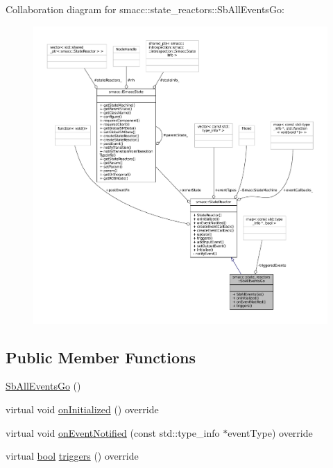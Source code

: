 Collaboration diagram for smacc\+:\+:state\+\_\+reactors\+:\+:Sb\+All\+Events\+Go\+:
\nopagebreak
\begin{figure}[H]
\begin{center}
\leavevmode
\includegraphics[width=350pt]{classsmacc_1_1state__reactors_1_1SbAllEventsGo__coll__graph}
\end{center}
\end{figure}
\subsection*{Public Member Functions}
\begin{DoxyCompactItemize}
\item 
\hyperlink{classsmacc_1_1state__reactors_1_1SbAllEventsGo_a0bd022a324d84f6ed994251f03763967}{Sb\+All\+Events\+Go} ()
\item 
virtual void \hyperlink{classsmacc_1_1state__reactors_1_1SbAllEventsGo_aa30be914b84434e72ab0f3889e27847b}{on\+Initialized} () override
\item 
virtual void \hyperlink{classsmacc_1_1state__reactors_1_1SbAllEventsGo_abdcbb98851ca97c0dd3c59970f28922f}{on\+Event\+Notified} (const std\+::type\+\_\+info $\ast$event\+Type) override
\item 
virtual \hyperlink{classbool}{bool} \hyperlink{classsmacc_1_1state__reactors_1_1SbAllEventsGo_a719f518ff5d591a7e82a0699bb8081ff}{triggers} () override
\end{DoxyCompactItemize}
